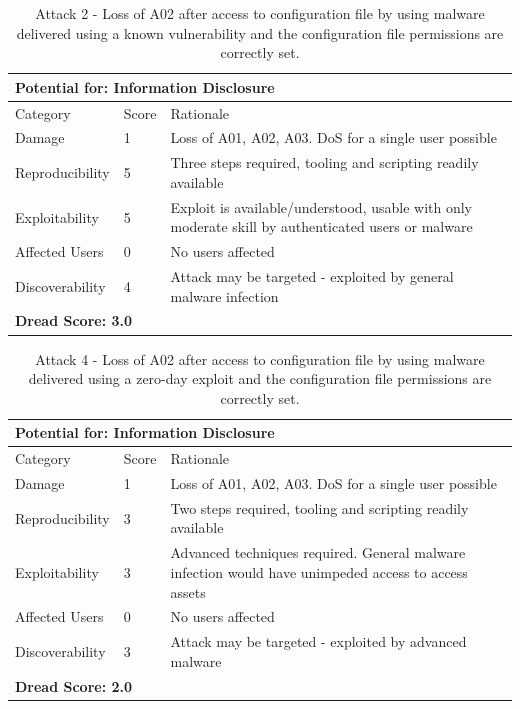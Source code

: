 \documentclass [11pt, proquest] {uwthesis}[2020/02/24]
\begin{document}
\begin{table}[H]
\begin{tabular}{|m{3cm}|m{.9cm}|p{27em} |}
\multicolumn{3}{l}{Potential for: Information Disclosure}  \\
\hline
Category & Score & Rationale \\
\hline
Damage          & 1     & Loss of A01, A02, A03. DoS for a single user possible \\
\hline
Reproducibility & 5     & Three steps required, tooling and scripting readily available  \\
\hline
Exploitability & 5      & Exploit is available/understood, usable with only moderate skill by authenticated users or malware \\
\hline
Affected Users  & 0     &  No users affected  \\
\hline
Discoverability & 4     & Attack may be targeted - exploited by general malware infection \\
\hline
\multicolumn{3}{l}{\textbf{Dread Score: 3.0}} 
\end{tabular}
\caption{Attack 2 - Loss of A02 after access to configuration file by using malware delivered using a known vulnerability and the configuration file permissions are correctly set.}
\label{hsm:attack2}
\end{table}

\begin{table}[H]
\begin{tabular}{|m{3cm}|m{.9cm}|p{27em} |}
\multicolumn{3}{l}{Potential for: Information Disclosure}  \\
\hline
Category & Score & Rationale \\
\hline
Damage          & 1     & Loss of A01, A02, A03. DoS for a single user possible  \\
\hline
Reproducibility & 3     & Two steps required, tooling and scripting readily available  \\
\hline
Exploitability & 3      & Advanced techniques required. General malware infection would have unimpeded access to access assets  \\
\hline
Affected Users  & 0     &  No users affected   \\
\hline
Discoverability & 3     & Attack may be targeted - exploited by advanced malware \\
\hline
\multicolumn{3}{l}{\textbf{Dread Score: 2.0}} 
\end{tabular}

\caption{Attack 4 - Loss of A02 after access to configuration file by using malware delivered using a zero-day exploit and the configuration file permissions are correctly set.}
\label{hsm:attack4}
\end{table}
\end{document}
